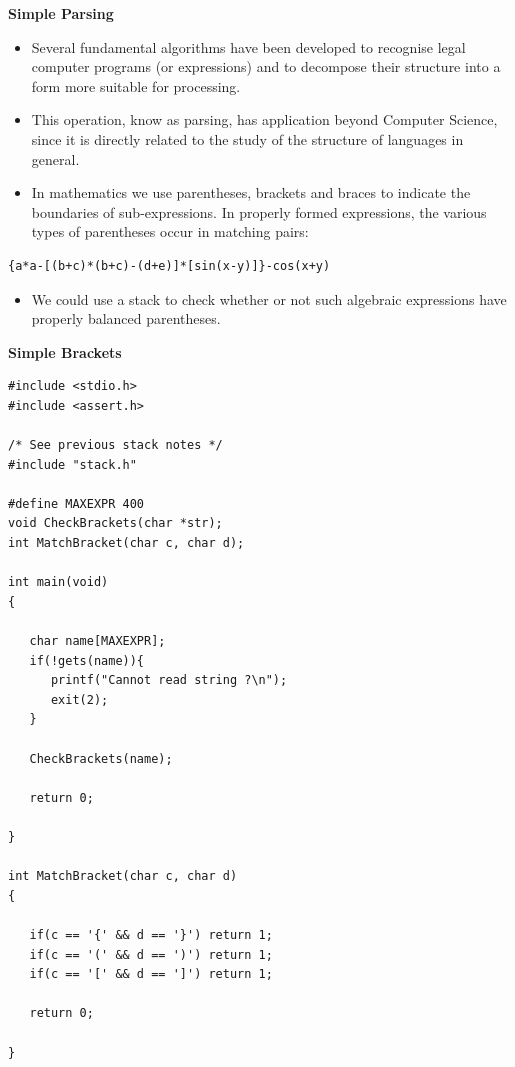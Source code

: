 \documentclass[a4,portraitt]{slides}
\begin{document}
\newpage
{\samepage
\begin{center}
{\Large{\bf Simple Parsing}}
\end{center}
\begin{itemize}
\item Several fundamental algorithms have been developed
to recognise legal computer programs (or expressions) and to
decompose their structure into a form more suitable for processing.
\item This operation, know as parsing, has application
beyond Computer Science, since it is directly related to the study of
the structure of languages in general.
\item In mathematics we use parentheses, brackets and
braces to indicate the boundaries of sub-expressions.
In properly formed expressions, the various types of parentheses occur in
matching pairs:
\end{itemize}
\begin{center}
{\small
\begin{verbatim}
{a*a-[(b+c)*(b+c)-(d+e)]*[sin(x-y)]}-cos(x+y)
\end{verbatim}
}
\end{center}
\begin{itemize}
\item We could use a stack to check whether or not such algebraic expressions
have properly balanced parentheses.
\end{itemize}
}

\newpage
{\samepage
\begin{center}
{\Large{\bf Simple Brackets}}
\end{center}
{\small
\begin{verbatim}
#include <stdio.h>
#include <assert.h>

/* See previous stack notes */
#include "stack.h"

#define MAXEXPR 400
void CheckBrackets(char *str);
int MatchBracket(char c, char d);

int main(void)
{

   char name[MAXEXPR];
   if(!gets(name)){
      printf("Cannot read string ?\n");
      exit(2);
   }

   CheckBrackets(name);

   return 0;

}

int MatchBracket(char c, char d)
{

   if(c == '{' && d == '}') return 1;
   if(c == '(' && d == ')') return 1;
   if(c == '[' && d == ']') return 1;

   return 0;

}
\end{verbatim}
}}
\end{document}

